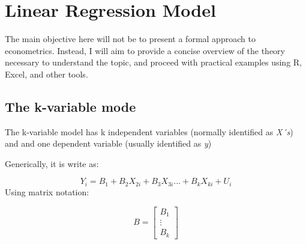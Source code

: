 \documentclass{article} %
\begin{document}
\section{Linear Regression Model}
The main objective here will not be to present a formal approach to econometrics. Instead, I will aim to provide a concise overview of the theory necessary to understand the topic, and proceed with practical examples using R, Excel, and other tools.

\subsection{The k-variable mode}
The k-variable model has k independent variables (normally identified as\textit{ X´s}) and and one dependent variable (usually identified as \textit{y})

Generically, it is write as:

\[Y_i = B_1 + B_2X_{2i}+B_3X_{3i}...+B_kX_{ki}+ U_i\]
Using matrix notation:

\[B = \begin{bmatrix}B_1 \\\vdots \\B_k\end{bmatrix}\]
\end{document}
